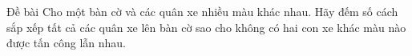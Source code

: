 Đề bài  
Cho một bàn cờ và các quân xe nhiều màu khác nhau. Hãy đếm số cách sắp xếp tất cả các quân xe lên bàn cờ sao cho không có hai con xe khác màu nào được tấn công lẫn nhau.